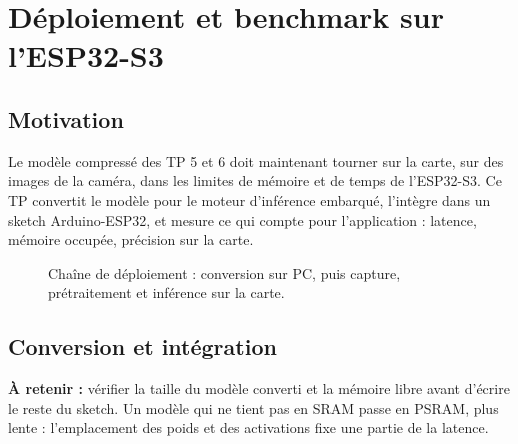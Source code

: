 
\chapter{Déploiement et benchmark sur l'ESP32-S3}

\section*{Motivation}

Le modèle compressé des TP 5 et 6 doit maintenant tourner sur la carte, sur des images de la caméra, dans les limites de mémoire et de temps de l'ESP32-S3. Ce TP convertit le modèle pour le moteur d'inférence embarqué, l'intègre dans un sketch Arduino-ESP32, et mesure ce qui compte pour l'application : latence, mémoire occupée, précision sur la carte. \\


\begin{figure}[H]
\centering
\resizebox{0.8\linewidth}{!}{}
\caption{Chaîne de déploiement : conversion sur PC, puis capture, prétraitement et inférence sur la carte.}
\label{fig:tp7-deploy}
\end{figure}

\section{Conversion et intégration}




\begin{imp}
\textbf{À retenir :} vérifier la taille du modèle converti et la mémoire libre avant d'écrire le reste du sketch. Un modèle qui ne tient pas en SRAM passe en PSRAM, plus lente : l'emplacement des poids et des activations fixe une partie de la latence.
\end{imp}

